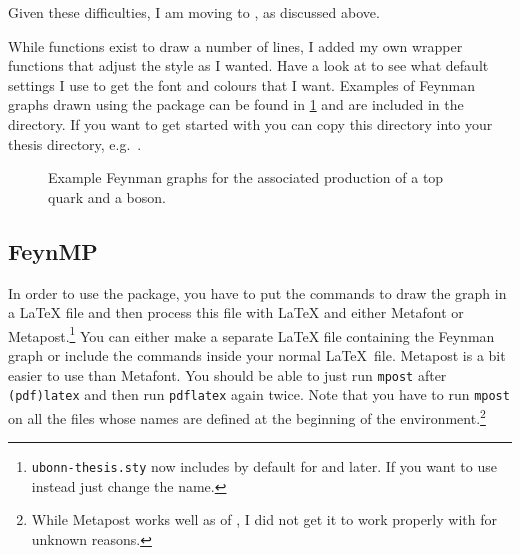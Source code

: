 Given these difficulties, I am moving to ,
as discussed above.

While functions exist to draw a number of lines, I added my own wrapper functions
that adjust the style as I wanted.
Have a look at  to see what default settings I use
to get the font and colours that I want.
Examples of Feynman graphs drawn using the package can be found in
\cref{fig:tZq-pyfeyn} and are included in the  directory.
If you want to get started with  you can copy this directory
into your thesis directory, e.g.\ .

\begin{figure}[htbp]
  \centering
  \quad
  \caption{Example Feynman graphs for the associated production
    of a top quark and a \PZ boson.}%
  \label{fig:tZq-pyfeyn}
\end{figure}


\subsection{FeynMP}%
\label{sec:fig:feynman:feynmp}

In order to use the  package, you have to put
the commands to draw the graph in a \LaTeX{} file and then process
this file with \LaTeX{} and either Metafont or
Metapost.\footnote{\texttt{ubonn-thesis.sty} now includes 
  by default for  and later. If you want to use
   instead just change the name.} 
You can either make
a separate \LaTeX{} file containing the Feynman graph or include the
commands inside your normal \LaTeX\ file.
Metapost is a bit easier to use than Metafont.
You should be able to just run
\texttt{mpost} after \texttt{(pdf)latex} and then run %
\texttt{pdflatex} again twice.
Note that you have to run
\texttt{mpost} on all the files whose names are defined at the
beginning of the  environment.\footnote{%
  While Metapost works well
  as of , I did not get it to work properly with  for unknown reasons.}

